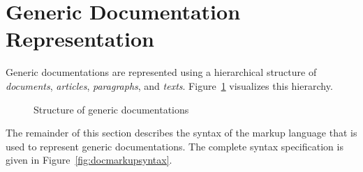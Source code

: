 \section{Generic Documentation Representation}

Generic documentations are represented using a hierarchical structure of \emph{documents}, \emph{articles}, \emph{paragraphs}, and \emph{texts}.
Figure~\ref{fig:docstructure} visualizes this hierarchy.

\begin{figure}
\caption{Structure of generic documentations}
\label{fig:docstructure}
\end{figure}

The remainder of this section describes the syntax of the markup language that is used to represent generic documentations.
The complete syntax specification is given in Figure~\ref{fig:docmarkupsyntax}.

